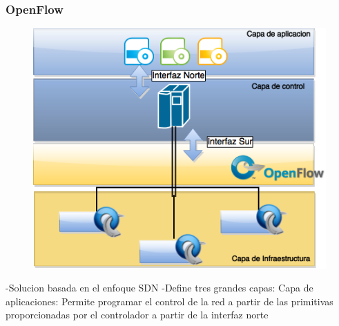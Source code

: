 \documentclass{beamer}
\begin{document}
\begin{frame}
\frametitle{OpenFlow} 
\begin{minipage}{0.50\textwidth}
	\begin{figure}[H]
		\raggedright
		\includegraphics[width=1.0\textwidth, right]{imagenes/openflowFull.png}
	\end{figure}

\end{minipage}
\hfill
\begin{minipage}{0.49\textwidth}
-Solucion basada en el enfoque SDN
-Define tres grandes capas:
Capa de aplicaciones:
Permite programar el control de la red a partir de las primitivas proporcionadas por el controlador a partir de la interfaz norte



\end{minipage}

\end{frame}
\end{document}
